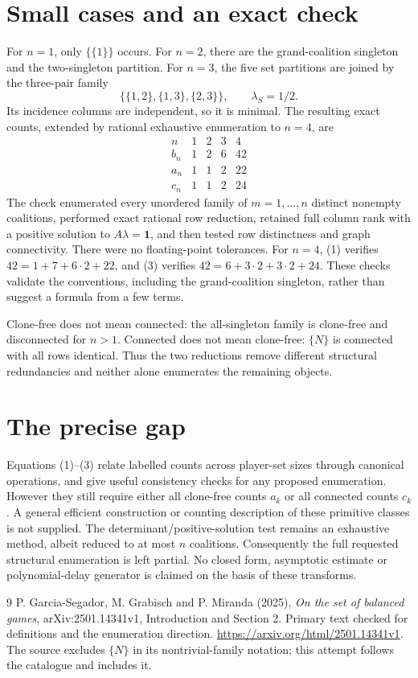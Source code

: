 \documentclass[11pt,a4paper]{article}
\begin{document}
\section{Small cases and an exact check}
For $n=1$, only $\{\{1\}\}$ occurs. For $n=2$, there are the grand-coalition singleton and the two-singleton partition. For $n=3$, the five set partitions are joined by the three-pair family
\[
 \{\{1,2\},\{1,3\},\{2,3\}\},\qquad\lambda_S=1/2.
\]
Its incidence columns are independent, so it is minimal. The resulting exact counts, extended by rational exhaustive enumeration to $n=4$, are
\[
\begin{array}{c|rrrr}
 n&1&2&3&4\\\hline
 b_n&1&2&6&42\\
 a_n&1&1&2&22\\
 c_n&1&1&2&24
\end{array}                                             \tag{4}
\]
The check enumerated every unordered family of $m=1,\ldots,n$ distinct nonempty coalitions, performed exact rational row reduction, retained full column rank with a positive solution to $A\lambda=\mathbf1$, and then tested row distinctness and graph connectivity. There were no floating-point tolerances. For $n=4$, (1) verifies $42=1+7+6\cdot2+22$, and (3) verifies $42=6+3\cdot2+3\cdot2+24$. These checks validate the conventions, including the grand-coalition singleton, rather than suggest a formula from a few terms.

Clone-free does not mean connected: the all-singleton family is clone-free and disconnected for $n>1$. Connected does not mean clone-free: $\{N\}$ is connected with all rows identical. Thus the two reductions remove different structural redundancies and neither alone enumerates the remaining objects.

\section{The precise gap}
Equations (1)--(3) relate labelled counts across player-set sizes through canonical operations, and give useful consistency checks for any proposed enumeration. However they still require either all clone-free counts $a_k$ or all connected counts $c_k$. A general efficient construction or counting description of these primitive classes is not supplied. The determinant/positive-solution test remains an exhaustive method, albeit reduced to at most $n$ coalitions. Consequently the full requested structural enumeration is left partial. No closed form, asymptotic estimate or polynomial-delay generator is claimed on the basis of these transforms.

\begin{thebibliography}{9}
 P. Garcia-Segador, M. Grabisch and P. Miranda (2025), \emph{On the set of balanced games}, arXiv:2501.14341v1, Introduction and Section 2. Primary text checked for definitions and the enumeration direction. \url{https://arxiv.org/html/2501.14341v1}. The source excludes $\{N\}$ in its nontrivial-family notation; this attempt follows the catalogue and includes it.
\end{thebibliography}
\end{document}
